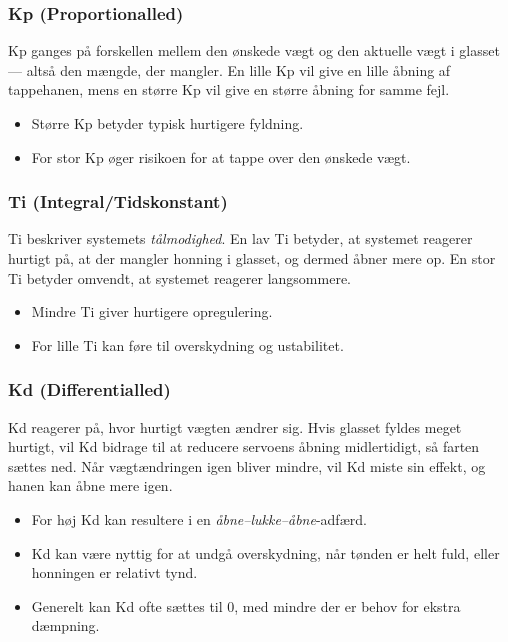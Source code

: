 \documentclass[11pt,a4paper]{article}
\begin{document}
\subsubsection*{Kp (Proportionalled)}

Kp ganges på forskellen mellem den ønskede vægt og den aktuelle vægt i glasset — altså den mængde, der mangler. En lille Kp vil give en lille åbning af tappehanen, mens en større Kp vil give en større åbning for samme fejl.

\begin{itemize}[leftmargin=*]
    \item Større Kp betyder typisk hurtigere fyldning.
    \item For stor Kp øger risikoen for at tappe over den ønskede vægt.
\end{itemize}

\subsubsection*{Ti (Integral/Tidskonstant)}

Ti beskriver systemets \textit{tålmodighed}. En lav Ti betyder, at systemet reagerer hurtigt på, at der mangler honning i glasset, og dermed åbner mere op. En stor Ti betyder omvendt, at systemet reagerer langsommere.

\begin{itemize}[leftmargin=*]
    \item Mindre Ti giver hurtigere opregulering.
    \item For lille Ti kan føre til overskydning og ustabilitet.
\end{itemize}

\subsubsection*{Kd (Differentialled)}

Kd reagerer på, hvor hurtigt vægten ændrer sig. Hvis glasset fyldes meget hurtigt, vil Kd bidrage til at reducere servoens åbning midlertidigt, så farten sættes ned. Når vægtændringen igen bliver mindre, vil Kd miste sin effekt, og hanen kan åbne mere igen.

\begin{itemize}[leftmargin=*]
    \item For høj Kd kan resultere i en \textit{åbne–lukke–åbne}-adfærd.
    \item Kd kan være nyttig for at undgå overskydning, når tønden er helt fuld, eller honningen er relativt tynd.
    \item Generelt kan Kd ofte sættes til 0, med mindre der er behov for ekstra dæmpning.
\end{itemize}
\end{document}
